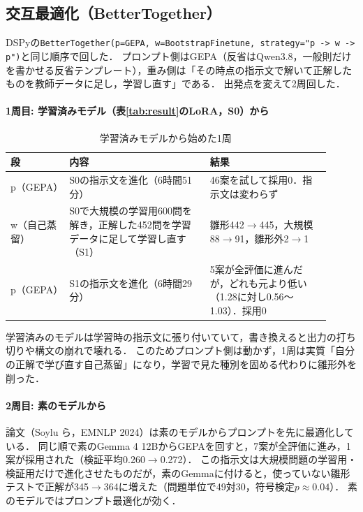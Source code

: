 \documentclass[12pt,a4paper]{article}
\begin{document}
\subsection{交互最適化（BetterTogether）}

DSPyの\texttt{BetterTogether(p=GEPA, w=BootstrapFinetune, strategy="p -> w -> p")}と同じ順序で回した．
プロンプト側はGEPA（反省はQwen3.8，一般則だけを書かせる反省テンプレート），重み側は「その時点の指示文で解いて正解したものを教師データに足し，学習し直す」である．
出発点を変えて2周回した．

\paragraph{1周目: 学習済みモデル（表\ref{tab:result}のLoRA，S0）から}

\begin{table}[H]
  \centering
  \caption{学習済みモデルから始めた1周}
  \label{tab:bt}
  \small
  \begin{tabular}{p{0.13\linewidth}p{0.42\linewidth}p{0.36\linewidth}}
    \toprule
    段 & 内容 & 結果 \\
    \midrule
    p（GEPA） & S0の指示文を進化（6時間51分） & 46案を試して採用0．指示文は変わらず \\
    w（自己蒸留） & S0で大規模の学習用600問を解き，正解した452問を学習データに足して学習し直す（S1） & 雛形442$\rightarrow$445，大規模88$\rightarrow$91，雛形外2$\rightarrow$1 \\
    p（GEPA） & S1の指示文を進化（6時間29分） & 5案が全評価に進んだが，どれも元より低い（1.28に対し0.56〜1.03）．採用0 \\
    \bottomrule
  \end{tabular}
\end{table}

学習済みのモデルは学習時の指示文に張り付いていて，書き換えると出力の打ち切りや構文の崩れで壊れる．
このためプロンプト側は動かず，1周は実質「自分の正解で学び直す自己蒸留」になり，学習で見た種別を固める代わりに雛形外を削った．

\paragraph{2周目: 素のモデルから}

論文（Soylu ら，EMNLP 2024）は素のモデルからプロンプトを先に最適化している．
同じ順で素のGemma 4 12BからGEPAを回すと，7案が全評価に進み，1案が採用された（検証平均0.260$\rightarrow$0.272）．
この指示文は大規模問題の学習用・検証用だけで進化させたものだが，素のGemmaに付けると，使っていない雛形テストで正解が345$\rightarrow$364に増えた（問題単位で49対30，符号検定$p \approx 0.04$）．
素のモデルではプロンプト最適化が効く．
\end{document}
